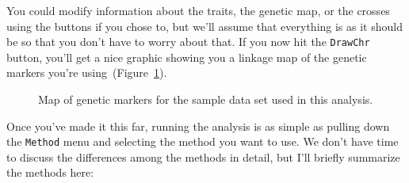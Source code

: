 \documentclass[12pt]{article}
\begin{document}
You could modify information about the traits, the genetic map, or the
crosses using the buttons if you chose to, but we'll assume that
everything is as it should be so that you don't have to worry about
that. If you now hit the {\tt DrawChr} button, you'll get a nice
graphic showing you a linkage map of the genetic markers you're
using~(Figure~\ref{fig:qtl-marker-map}).

\begin{figure}
\begin{center}
\end{center}
\caption{Map of genetic markers for the sample data set used in this analysis.}\label{fig:qtl-marker-map}
\end{figure}

Once you've made it this far, running the analysis is as simple as
pulling down the {\tt Method} menu and selecting the method you want
to use. We don't have time to discuss the differences among the
methods in detail, but I'll briefly summarize the methods here:
\end{document}
